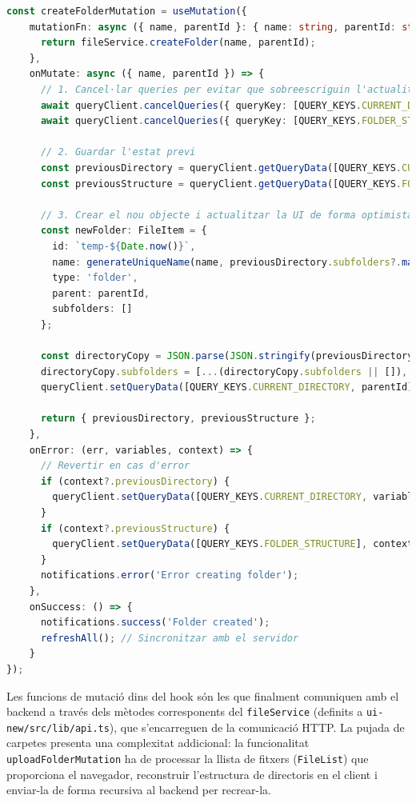 \begin{lstlisting}[language=typescript, caption={Implementació d'una mutació optimista a `useFileOperations.ts`}]
const createFolderMutation = useMutation({
    mutationFn: async ({ name, parentId }: { name: string, parentId: string }) => {
      return fileService.createFolder(name, parentId);
    },
    onMutate: async ({ name, parentId }) => {
      // 1. Cancel·lar queries per evitar que sobreescriguin l'actualització optimista
      await queryClient.cancelQueries({ queryKey: [QUERY_KEYS.CURRENT_DIRECTORY, parentId] });
      await queryClient.cancelQueries({ queryKey: [QUERY_KEYS.FOLDER_STRUCTURE] });
      
      // 2. Guardar l'estat previ
      const previousDirectory = queryClient.getQueryData([QUERY_KEYS.CURRENT_DIRECTORY, parentId]) as FileItem;
      const previousStructure = queryClient.getQueryData([QUERY_KEYS.FOLDER_STRUCTURE]);
      
      // 3. Crear el nou objecte i actualitzar la UI de forma optimista
      const newFolder: FileItem = {
        id: `temp-${Date.now()}`,
        name: generateUniqueName(name, previousDirectory.subfolders?.map((f: FileItem) => f.name) || [], name, true),
        type: 'folder',
        parent: parentId,
        subfolders: []
      };

      const directoryCopy = JSON.parse(JSON.stringify(previousDirectory));
      directoryCopy.subfolders = [...(directoryCopy.subfolders || []), newFolder];
      queryClient.setQueryData([QUERY_KEYS.CURRENT_DIRECTORY, parentId], directoryCopy);
      
      return { previousDirectory, previousStructure };
    },
    onError: (err, variables, context) => {
      // Revertir en cas d'error
      if (context?.previousDirectory) {
        queryClient.setQueryData([QUERY_KEYS.CURRENT_DIRECTORY, variables.parentId], context.previousDirectory);
      }
      if (context?.previousStructure) {
        queryClient.setQueryData([QUERY_KEYS.FOLDER_STRUCTURE], context.previousStructure);
      }
      notifications.error('Error creating folder');
    },
    onSuccess: () => {
      notifications.success('Folder created');
      refreshAll(); // Sincronitzar amb el servidor
    }
});
\end{lstlisting}

Les funcions de mutació dins del hook són les que finalment comuniquen amb el backend a través dels mètodes corresponents del \texttt{fileService} (definits a \texttt{ui-new/src/lib/api.ts}), que s'encarreguen de la comunicació HTTP. La pujada de carpetes presenta una complexitat addicional: la funcionalitat \texttt{uploadFolderMutation} ha de processar la llista de fitxers (\texttt{FileList}) que proporciona el navegador, reconstruir l'estructura de directoris en el client i enviar-la de forma recursiva al backend per recrear-la.

